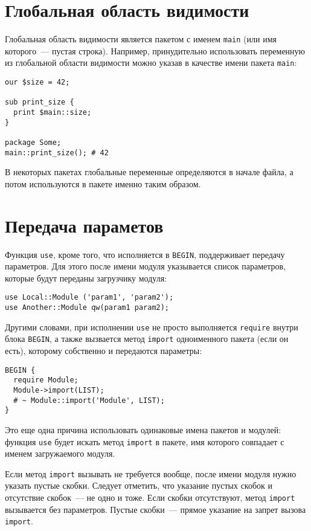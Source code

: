 \section{Глобальная область видимости} %
Глобальная область видимости является пакетом с именем \verb|main| (или имя которого~--- пустая строка). Например, принудительно использовать переменную из глобальной области видимости можно указав в качестве имени пакета \verb|main|:
\begin{verbatim}
our $size = 42;

sub print_size {
  print $main::size;
}

package Some;
main::print_size(); # 42
\end{verbatim}
В некоторых пакетах глобальные переменные определяются в начале файла, а потом используются в пакете именно таким образом.

\section{Передача параметов} %
Функция \verb|use|, кроме того, что исполняется в \verb|BEGIN|, поддерживает передачу параметров. Для этого после имени модуля указывается список параметров, которые будут переданы загрузчику модуля:
\begin{verbatim}
use Local::Module ('param1', 'param2');
use Another::Module qw(param1 param2);
\end{verbatim}
Другими словами, при исполнении \verb|use| не просто выполняется \verb|require| внутри блока \verb|BEGIN|, а также вызвается метод \verb|import| одноименного пакета (если он есть), которому собственно и передаются параметры:
\begin{verbatim}
BEGIN {
  require Module;
  Module->import(LIST);
  # ~ Module::import('Module', LIST);
}
\end{verbatim}
Это еще одна причина использовать одинаковые имена пакетов и модулей: функция \verb|use| будет искать метод \verb|import| в пакете, имя которого совпадает с именем загружаемого модуля.

Если метод \verb|import| вызывать не требуется вообще, после имени модуля нужно указать пустые скобки. Следует отметить, что указание пустых скобок и отсутствие скобок~--- не одно и тоже. Если скобки отсутствуют, метод \verb|import| вызывается без параметров. Пустые скобки~--- прямое указание на запрет вызова \verb|import|.

